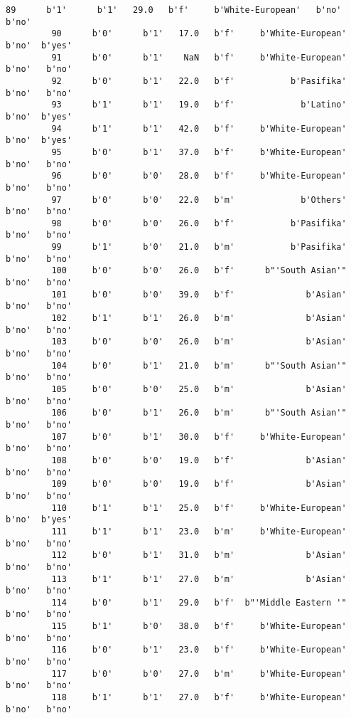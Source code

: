 \documentclass[11pt]{article}
\begin{document}
\begin{Verbatim}[commandchars=\\\{\}]
         89      b'1'      b'1'   29.0   b'f'     b'White-European'   b'no'   b'no'   
         90      b'0'      b'1'   17.0   b'f'     b'White-European'   b'no'  b'yes'   
         91      b'0'      b'1'    NaN   b'f'     b'White-European'   b'no'   b'no'   
         92      b'0'      b'1'   22.0   b'f'           b'Pasifika'   b'no'   b'no'   
         93      b'1'      b'1'   19.0   b'f'             b'Latino'   b'no'  b'yes'   
         94      b'1'      b'1'   42.0   b'f'     b'White-European'   b'no'  b'yes'   
         95      b'0'      b'1'   37.0   b'f'     b'White-European'   b'no'   b'no'   
         96      b'0'      b'0'   28.0   b'f'     b'White-European'   b'no'   b'no'   
         97      b'0'      b'0'   22.0   b'm'             b'Others'   b'no'   b'no'   
         98      b'0'      b'0'   26.0   b'f'           b'Pasifika'   b'no'   b'no'   
         99      b'1'      b'0'   21.0   b'm'           b'Pasifika'   b'no'   b'no'   
         100     b'0'      b'0'   26.0   b'f'      b"'South Asian'"   b'no'   b'no'   
         101     b'0'      b'0'   39.0   b'f'              b'Asian'   b'no'   b'no'   
         102     b'1'      b'1'   26.0   b'm'              b'Asian'   b'no'   b'no'   
         103     b'0'      b'0'   26.0   b'm'              b'Asian'   b'no'   b'no'   
         104     b'0'      b'1'   21.0   b'm'      b"'South Asian'"   b'no'   b'no'   
         105     b'0'      b'0'   25.0   b'm'              b'Asian'   b'no'   b'no'   
         106     b'0'      b'1'   26.0   b'm'      b"'South Asian'"   b'no'   b'no'   
         107     b'0'      b'1'   30.0   b'f'     b'White-European'   b'no'   b'no'   
         108     b'0'      b'0'   19.0   b'f'              b'Asian'   b'no'   b'no'   
         109     b'0'      b'0'   19.0   b'f'              b'Asian'   b'no'   b'no'   
         110     b'1'      b'1'   25.0   b'f'     b'White-European'   b'no'  b'yes'   
         111     b'1'      b'1'   23.0   b'm'     b'White-European'   b'no'   b'no'   
         112     b'0'      b'1'   31.0   b'm'              b'Asian'   b'no'   b'no'   
         113     b'1'      b'1'   27.0   b'm'              b'Asian'   b'no'   b'no'   
         114     b'0'      b'1'   29.0   b'f'  b"'Middle Eastern '"   b'no'   b'no'   
         115     b'1'      b'0'   38.0   b'f'     b'White-European'   b'no'   b'no'   
         116     b'0'      b'1'   23.0   b'f'     b'White-European'   b'no'   b'no'   
         117     b'0'      b'0'   27.0   b'm'     b'White-European'   b'no'   b'no'   
         118     b'1'      b'1'   27.0   b'f'     b'White-European'   b'no'   b'no'   

\end{Verbatim}
\end{document}
